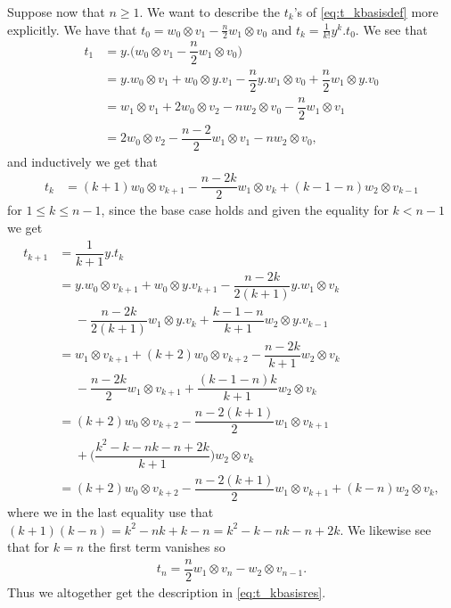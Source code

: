 Suppose now that $n\geq 1$. We want to describe the $t_k$'s of \cref{eq:t_kbasisdef} more explicitly. We have that $t_0=w_0\otimes v_1 - \tfrac{n}{2}w_1\otimes v_0$ and $t_k=\tfrac{1}{k!}y^k . t_0$. We see that
\begin{align*}
  t_1 &= y.\bigl(w_0\otimes v_1 - \dfrac{n}{2}w_1\otimes v_0\bigr) \\
      &= y.w_0\otimes v_1 + w_0\otimes y.v_1 - \dfrac{n}{2}y.w_1\otimes v_0 + \dfrac{n}{2}w_1\otimes y.v_0 \\
      &= w_1\otimes v_1 + 2w_0\otimes v_2 - nw_2\otimes v_0 - \dfrac{n}{2}w_1\otimes v_1 \\
  &= 2w_0\otimes v_2 -\dfrac{n-2}{2}w_1\otimes v_1 - nw_2\otimes v_0,
\end{align*}
and inductively we get that
\begin{align*}
  t_k &= (k+1)w_0\otimes v_{k+1} - \dfrac{n-2k}{2}w_1\otimes v_k + (k-1-n)w_2\otimes v_{k-1}
\end{align*}
for $1\leq k\leq n-1$, since the base case holds and given the equality for $k<n-1$ we get
\begin{align*}
  t_{k+1} &= \dfrac{1}{k+1}y.t_k \\
         &= y.w_0\otimes v_{k+1} + w_0\otimes y.v_{k+1} - \dfrac{n-2k}{2(k+1)}y.w_1\otimes v_k \\
          &\phantom{{}={}}{} - \dfrac{n-2k}{2(k+1)}w_1\otimes y.v_k + \dfrac{k-1-n}{k+1}w_2\otimes y.v_{k-1} \\
          &= w_1\otimes v_{k+1} + (k+2)w_0\otimes v_{k+2} - \dfrac{n-2k}{k+1}w_2\otimes v_k \\
          &\phantom{{}={}}{} - \dfrac{n-2k}{2}w_1\otimes v_{k+1} + \dfrac{(k-1-n)k}{k+1}w_2\otimes v_k \\
          &= (k+2)w_0\otimes v_{k+2} - \dfrac{n-2(k+1)}{2}w_1\otimes v_{k+1} \\
          &\phantom{{}={}}{} + \biggl( \dfrac{k^2-k-nk-n+2k}{k+1} \biggr) w_2\otimes v_k \\
  &= (k+2)w_0\otimes v_{k+2} - \dfrac{n-2(k+1)}{2}w_1\otimes v_{k+1} + (k-n)w_2\otimes v_k,
\end{align*}
where we in the last equality use that $(k+1)(k-n)=k^2-nk+k-n = k^2-k-nk-n+2k$. We likewise see that for $k=n$ the first term vanishes so
\begin{align*}
  t_n = \dfrac{n}{2}w_1\otimes v_n - w_2\otimes v_{n-1}.
\end{align*}
Thus we altogether get the description in \cref{eq:t_kbasisres}.

